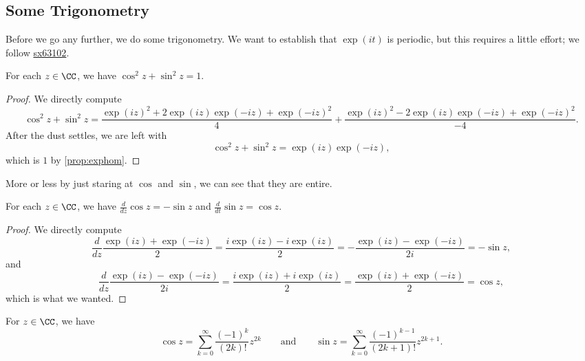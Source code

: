 \subsection{Some Trigonometry}
Before we go any further, we do some trigonometry. We want to establish that $\exp(it)$ is periodic, but this requires a little effort; we follow \href{https://math.stackexchange.com/a/63109/869257}{sx63102}.
\begin{lemma} \label{lem:sumsquares}
	For each $z\in\CC$, we have $\cos^2z+\sin^2z=1$.
\end{lemma}
\begin{proof}
	We directly compute
	\[\cos^2z+\sin^2z=\frac{\exp(iz)^2+2\exp(iz)\exp(-iz)+\exp(-iz)^2}{4}+\frac{\exp(iz)^2-2\exp(iz)\exp(-iz)+\exp(-iz)^2}{-4}.\]
	After the dust settles, we are left with
	\[\cos^2z+\sin^2z=\exp(iz)\exp(-iz),\]
	which is $1$ by \autoref{prop:exphom}.
\end{proof}
More or less by just staring at $\cos$ and $\sin$, we can see that they are entire.
\begin{lemma} \label{lem:trigderivs}
	For each $z\in\CC$, we have $\frac d{dz}\cos z=-\sin z$ and $\frac d{dt}\sin z=\cos z$.
\end{lemma}
\begin{proof}
	We directly compute
	\[\frac d{dz}\frac{\exp(iz)+\exp(-iz)}2=\frac{i\exp(iz)-i\exp(iz)}2=-\frac{\exp(iz)-\exp(-iz)}{2i}=-\sin z,\]
	and
	\[\frac d{dz}\frac{\exp(iz)-\exp(-iz)}{2i}=\frac{i\exp(iz)+i\exp(iz)}2=\frac{\exp(iz)+\exp(-iz)}{2}=\cos z,\]
	which is what we wanted.
\end{proof}
\begin{lemma} \label{lem:powerseriescossin}
	For $z\in\CC$, we have
	\[\cos z=\sum_{k=0}^\infty\frac{(-1)^k}{(2k)!}z^{2k}\qquad\text{and}\qquad\sin z=\sum_{k=0}^\infty\frac{(-1)^{k-1}}{(2k+1)!}z^{2k+1}.\]
\end{lemma}
